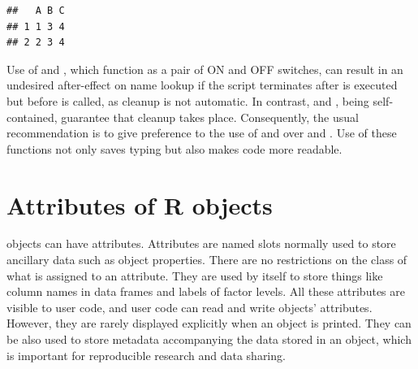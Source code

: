 \documentclass[krantz2]{krantz}\usepackage{knitr}
\begin{document}
\begin{explainbox}
\begin{knitrout}\footnotesize
{}\color{fgcolor}\begin{kframe}
\begin{alltt}
\hlopt{$} \hlkwb{<-} 
\end{alltt}


{\ttfamily\noindent\itshape\color{messagecolor}{\#\# The following object is masked \_by\_ .GlobalEnv:\\\#\# \\\#\# \ \ \ \ A}}\begin{alltt}
\hlopt{$} \hlkwb{<-}  \hlopt{+}  \hlopt{/} 
 \hlstd{)}
\end{alltt}
\begin{verbatim}
##   A B C
## 1 1 3 4
## 2 2 3 4
\end{verbatim}
\end{kframe}
\end{knitrout}

Use of  and , which function as a pair of ON and OFF switches, can result in an undesired after-effect on name lookup if the script terminates after  is executed but before  is called, as cleanup is not automatic. In contrast,  and , being self-contained, guarantee that cleanup takes place. Consequently, the usual recommendation is to give preference to the use of  and  over  and . Use of these functions not only saves typing but also makes code more readable.
\end{explainbox}




\section{Attributes of R objects}\label{sec:calc:attributes}

\Rlang objects can have attributes. Attributes are named slots normally used to store ancillary data such as object properties. There are no restrictions on the class of what is assigned to an attribute. They are used by \Rlang itself to store things like column names in data frames and labels of factor levels. All these attributes are visible to user code, and user code can read and write objects' attributes. However, they are rarely displayed explicitly when an object is printed. They can be also used to store metadata accompanying the data stored in an object, which is important for reproducible research and data sharing.
\end{document}
